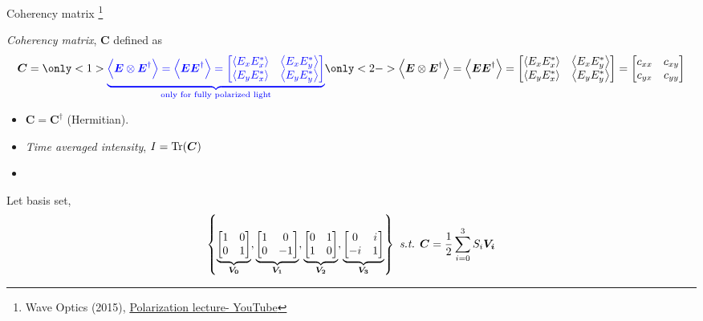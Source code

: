\documentclass[12pt, dvipsnames]{beamer}
\numberwithin{equation}{section}
\newcommand\blfootnote[1]{%
	\begingroup
	\renewcommand\thefootnote{}\footnote{#1}%
	\addtocounter{footnote}{-1}%
	\endgroup
}
\begin{document}
\begin{frame}{Coherency matrix}\blfootnote{Wave Optics (2015), \href{https://www.youtube.com/watch?v=RowMxWt4mVE&list=LL&index=5}{Polarization lecture- YouTube}}
	\textit{Coherency matrix}, $\boldsymbol{C}$ defined as 
	\begin{align*}
		\boldsymbol{C}=\only<1>{{\color{blue}\underbrace{\expval{\boldsymbol{E}\otimes\boldsymbol{E}^\dagger}= \expval{\boldsymbol{E}\boldsymbol{E}^\dagger}=
		\begin{bmatrix}
			\expval{E_xE_x^\ast} & \expval{E_xE_y^\ast}\\
			\expval{E_yE_x^\ast} & \expval{E_yE_y^\ast}
		\end{bmatrix}}_{\text{only for fully polarized light}}}}
		\only<2->{\expval{\boldsymbol{E}\otimes\boldsymbol{E}^\dagger}= \expval{\boldsymbol{E}\boldsymbol{E}^\dagger}=
			\begin{bmatrix}
				\expval{E_xE_x^\ast} & \expval{E_xE_y^\ast}\\
				\expval{E_yE_x^\ast} & \expval{E_yE_y^\ast}
			\end{bmatrix}}=
		\begin{bmatrix}
			c_{xx} & c_{xy}\\
			c_{yx} & c_{yy}
		\end{bmatrix}
	\end{align*}\pause
	\begin{itemize}
		\item
		$\boldsymbol{C}=\boldsymbol{C}^\dagger$ (Hermitian).
		
		\item 
		\textit{Time averaged intensity}, $I=\Tr(\boldsymbol{C})$
		
		\item {}
	\end{itemize}\pause

	Let basis set, 
	$$\left\{
	\underbrace{\begin{bmatrix}1 & 0 \\ 0 & 1\\\end{bmatrix}}_{\boldsymbol{V_0}},
	\underbrace{\begin{bmatrix}1 & 0 \\ 0 & -1\\\end{bmatrix}}_{\boldsymbol{V_1}},
	\underbrace{\begin{bmatrix}0 & 1 \\ 1 & 0\\\end{bmatrix}}_{\boldsymbol{V_2}},
	\underbrace{\begin{bmatrix}0 & i \\ -i & 1\\\end{bmatrix}}_{\boldsymbol{V_3}}
	\right\} \text{ \textit{s.t.} } \boldsymbol{C} = \frac{1}{2} \sum_{i=0}^{3} S_i \boldsymbol{V_i}$$
\end{frame}
\end{document}
